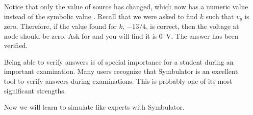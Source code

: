Notice that only the value of source  has changed, which
now has a numeric value instead of the symbolic value .
Recall that we were asked to find $k$ such that $v_y$ is zero.
Therefore, if the value found for $k$, $-13/4$, is correct, then the
voltage at node  should be zero. Ask for  and you
will find it is 0~V. The answer has been verified.

Being able to verify answers is of special importance for a student
during an important examination. Many users recognize that
Symbulator is an excellent tool to verify answers during
examinations. This is probably one of its most significant
strengths.

Now we will learn to simulate like experts with Symbulator.
